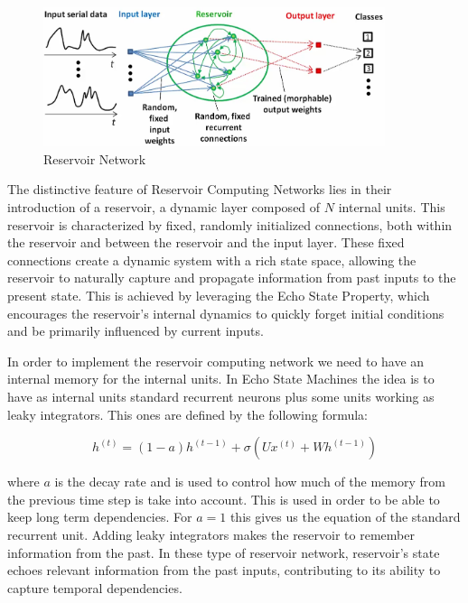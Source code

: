\begin{figure}[h!]
    \centering
    \includegraphics[width=10cm]{Images/reservoir-network.png}
    \caption{Reservoir Network}
\end{figure}


\noindent The distinctive feature of Reservoir Computing Networks lies in their introduction of a reservoir, a dynamic layer composed of $N$ internal units. This reservoir is characterized by fixed, randomly initialized connections, both within the reservoir and between the reservoir and the input layer. These fixed connections create a dynamic system with a rich state space, allowing the reservoir to naturally capture and propagate information from past inputs to the present state. This is achieved by leveraging the Echo State Property, which encourages the reservoir's internal dynamics to quickly forget initial conditions and be primarily influenced by current inputs. 

\noindent In order to implement the reservoir computing network we need to have an internal memory for the internal units. In Echo State Machines the idea is to have as internal units standard recurrent neurons plus some units working as leaky integrators. This ones are defined by the following formula:

$$ h^{(t)} = (1 - a)h^{(t-1)} + \sigma \left( U x^{(t)} + W h^{(t-1)} \right) $$

where $a$ is the decay rate and is used to control how much of the memory from the previous time step is take into account. This is used in order to be able to keep long term dependencies. For $a=1$ this gives us the equation of the standard recurrent unit. Adding leaky integrators makes the reservoir to remember information from the past. In these type of reservoir network, reservoir's state echoes relevant information from the past inputs, contributing to its ability to capture temporal dependencies. 


